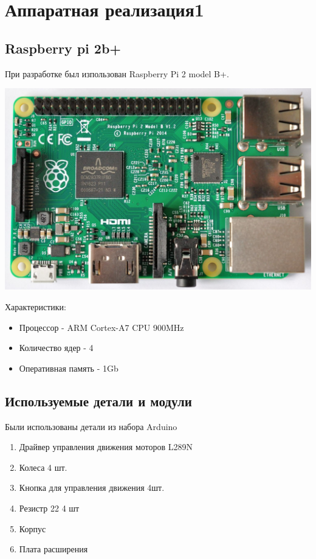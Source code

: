 \documentclass[a4paper,12pt]{article}
\begin{document}


\tableofcontents
\newpage

\section{Аппаратная реализация1}
\subsection{Raspberry pi 2b+}
При разработке был изпользован Raspberry Pi 2 model B+.
\begin{center}
  \includegraphics[width=\textwidth]{raspberry_pi2_b.pdf}
\end{center}
Характеристики:
\begin{itemize}
  \item Процессор - ARM Cortex-A7 CPU 900MHz
  \item Количество ядер - 4
  \item Оперативная память - 1Gb
\end{itemize}


\subsection{Используемые детали и модули}
Были использованы детали из набора Arduino
\begin{enumerate}
  \item Драйвер управления движения моторов L289N
  \item Колеса 4 шт.
  \item Кнопка для управления движения 4шт.
  \item Резистр 22\unit{\Omega} 4 шт
  \item Корпус
  \item Плата расширения
\end{enumerate}
\end{document}
